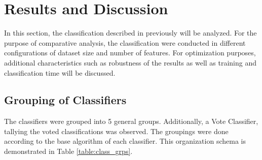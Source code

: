 \section{Results and Discussion}
	In this section, the classification described in previously will be analyzed. For the purpose of comparative analysis, the classification were conducted in different configurations of dataset size and number of features. For optimization purposes, additional characteristics such as robustness of the results as well as training and classification time will be discussed.
	
	\subsection{Grouping of Classifiers}
		The classifiers were grouped into 5 general groups. Additionally, a Vote Classifier, tallying the voted classifications was observed. The groupings were done according to the base algorithm of each classifier. This organization schema is demonstrated in Table \ref{table:class_grps}.
		
